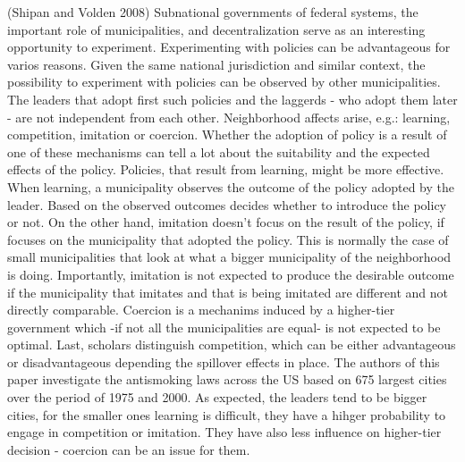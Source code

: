 \documentclass[
  letterpaper,
  DIV=11,
  numbers=noendperiod]{scrartcl}
\begin{document}
(Shipan and Volden 2008) Subnational governments of federal systems, the
important role of municipalities, and decentralization serve as an
interesting opportunity to experiment. Experimenting with policies can
be advantageous for varios reasons. Given the same national jurisdiction
and similar context, the possibility to experiment with policies can be
observed by other municipalities. The leaders that adopt first such
policies and the laggerds - who adopt them later - are not independent
from each other. Neighborhood affects arise, e.g.: learning,
competition, imitation or coercion. Whether the adoption of policy is a
result of one of these mechanisms can tell a lot about the suitability
and the expected effects of the policy. Policies, that result from
learning, might be more effective. When learning, a municipality
observes the outcome of the policy adopted by the leader. Based on the
observed outcomes decides whether to introduce the policy or not. On the
other hand, imitation doesn't focus on the result of the policy, if
focuses on the municipality that adopted the policy. This is normally
the case of small municipalities that look at what a bigger municipality
of the neighborhood is doing. Importantly, imitation is not expected to
produce the desirable outcome if the municipality that imitates and that
is being imitated are different and not directly comparable. Coercion is
a mechanims induced by a higher-tier government which -if not all the
municipalities are equal- is not expected to be optimal. Last, scholars
distinguish competition, which can be either advantageous or
disadvantageous depending the spillover effects in place. The authors of
this paper investigate the antismoking laws across the US based on 675
largest cities over the period of 1975 and 2000. As expected, the
leaders tend to be bigger cities, for the smaller ones learning is
difficult, they have a hihger probability to engage in competition or
imitation. They have also less influence on higher-tier decision -
coercion can be an issue for them.
\end{document}
